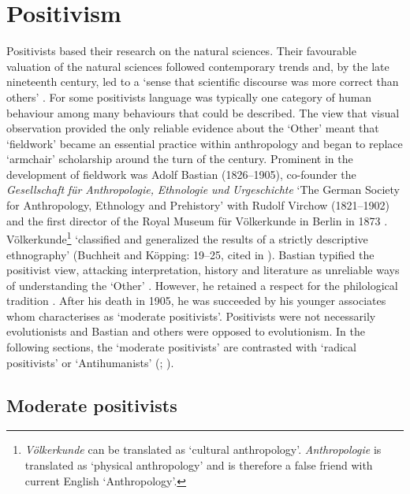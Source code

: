 \documentclass[output=paper]{langsci/langscibook}
\begin{document}
\section{Positivism} 

Positivists based their research on the natural sciences. Their favourable valuation of the natural sciences followed contemporary trends and, by the late nineteenth century, led to a ‘sense that scientific discourse was more correct than others’ \citep[154]{crick_explorations_1976}. For some positivists language was typically one category of human behaviour among many behaviours that could be described. The view that visual observation provided the only reliable evidence about the ‘Other’ meant that ‘fieldwork’ became an essential practice within anthropology and began to replace ‘armchair’ scholarship around the turn of the century. Prominent in the development of fieldwork was Adolf Bastian (1826--1905), co-founder the \textit{Gesellschaft} \textit{für} \textit{Anthropologie,} \textit{Ethnologie} \textit{und} \textit{Urgeschichte} ‘The German Society for Anthropology, Ethnology and Prehistory’ with Rudolf Virchow (1821--1902) and the first director of the Royal Museum für Völkerkunde in Berlin in 1873 \citep{kopping_adolf_1983}. Völkerkunde\footnote{ \textrm{\textit{Völkerkunde}} \textrm{can be translated as ‘cultural anthropology’.} \textrm{\textit{Anthropologie}} \textrm{is translated as ‘physical anthropology’ \citep[82]{stocking_virchow_1996} and is therefore a false friend with current English ‘Anthropology’.}} ‘classified and generalized the results of a strictly descriptive ethnography’ (Buchheit and Köpping: 19--25, cited in \citealt[87]{barth_german-speaking_2005}). Bastian typified the positivist view, attacking interpretation, history and literature as unreliable ways of understanding the ‘Other’ \citep[61]{zimmerman_anthropology_2001}. However, he retained a respect for the philological tradition \citep[89]{barth_german-speaking_2005}.  After his death in 1905, he was succeeded by his younger associates whom \citet[91]{barth_german-speaking_2005} characterises as ‘moderate positivists’. Positivists were not necessarily evolutionists and Bastian and others were opposed to evolutionism. In the following sections, the ‘moderate positivists’ \citep[99]{barth_german-speaking_2005} are contrasted with ‘radical positivists’ or ‘Antihumanists’ (\citealt{zimmerman_anthropology_2001}; \citealt{monteath_globalising_2013}). 

\subsection{Moderate positivists}
\end{document}
